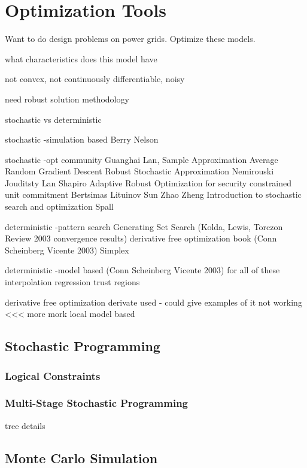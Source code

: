 \section{Optimization Tools}

Want to do design problems on power grids.  Optimize these models. 

what characteristics does this model have

not convex, not continuously differentiable, noisy 

need robust solution methodology 


stochastic vs deterministic

stochastic 
-simulation based
Berry Nelson

stochastic
-opt community
Guanghai Lan, 
Sample Approximation Average
Random Gradient Descent
Robust Stochastic Approximation Nemirouski Jouditsty Lan Shapiro
Adaptive Robust Optimization for security constrained unit commitment Bertsimas Lituinov Sun Zhao Zheng
Introduction to stochastic search and optimization Spall

deterministic
-pattern search
Generating Set Search (Kolda, Lewis, Torczon Review 2003 convergence results)
derivative free optimization book (Conn Scheinberg Vicente 2003)
Simplex

deterministic
-model based (Conn Scheinberg Vicente 2003) for all of these
interpolation
regression
trust regions


derivative free optimization
derivate used - could give examples of it not working <<< more mork
local model based

\subsection{Stochastic Programming}

\subsubsection{Logical Constraints}

\subsubsection{Multi-Stage Stochastic Programming}
tree details


\subsection{Monte Carlo Simulation}

